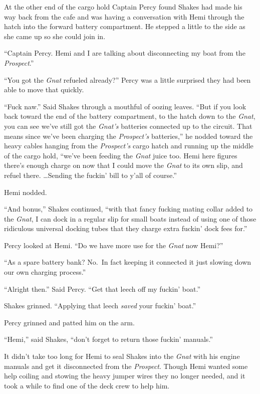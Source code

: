\documentclass[
]{scrbook}
\begin{document}
At the other end of the cargo hold Captain Percy found Shakes had made
his way back from the cafe and was having a conversation with Hemi
through the hatch into the forward battery compartment. He stepped a
little to the side as she came up so she could join in.

``Captain Percy. Hemi and I are talking about disconnecting my boat from
the \emph{Prospect}.''

``You got the \emph{Gnat} refueled already?'' Percy was a little
surprised they had been able to move that quickly.

``Fuck naw.'' Said Shakes through a mouthful of oozing leaves. ``But if
you look back toward the end of the battery compartment, to the hatch
down to the \emph{Gnat}, you can see we've still got the \emph{Gnat's}
batteries connected up to the circuit. That means since we've been
charging the \emph{Prospect's} batteries,'' he nodded toward the heavy
cables hanging from the \emph{Prospect's} cargo hatch and running up the
middle of the cargo hold, ``we've been feeding the \emph{Gnat} juice
too. Hemi here figures there's enough charge on now that I could move
the \emph{Gnat} to its own slip, and refuel there. \ldots Sending the
fuckin' bill to y'all of course.''

Hemi nodded.

``And bonus,'' Shakes continued, ``with that fancy fucking mating collar
added to the \emph{Gnat}, I can dock in a regular slip for small boats
instead of using one of those ridiculous universal docking tubes that
they charge extra fuckin' dock fees for.''

Percy looked at Hemi. ``Do we have more use for the \emph{Gnat} now
Hemi?''

``As a spare battery bank? No.~In fact keeping it connected it just
slowing down our own charging process.''

``Alright then.'' Said Percy. ``Get that leech off my fuckin' boat.''

Shakes grinned. ``Applying that leech \emph{saved} your fuckin' boat.''

Percy grinned and patted him on the arm.

``Hemi,'' said Shakes, ``don't forget to return those fuckin' manuals.''

It didn't take too long for Hemi to seal Shakes into the \emph{Gnat}
with his engine manuals and get it disconnected from the
\emph{Prospect}. Though Hemi wanted some help coiling and stowing the
heavy jumper wires they no longer needed, and it took a while to find
one of the deck crew to help him.
\end{document}
